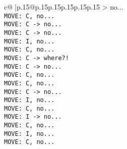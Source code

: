\documentclass{article}
\begin{document}
{\begin{supertabular}{c@{$\;$}|p{.15\linewidth}@{}p{.15\linewidth}p{.15\linewidth}p{.15\linewidth}p{.15\linewidth}p{.15\linewidth}}
{{{> no...\\ \tt  MOVE: C, no...\\ \tt  MOVE: C -> no...\\ \tt  MOVE: C -> no...\\ \tt  MOVE: I, no...\\ \tt  MOVE: C, no...\\ \tt  MOVE: C -> where?!\\ \tt  MOVE: C -> no...\\ \tt  MOVE: C, no...\\ \tt  MOVE: C, no...\\ \tt  MOVE: C -> no...\\ \tt  MOVE: I, no...\\ \tt  MOVE: C, no...\\ \tt  MOVE: I -> no...\\ \tt  MOVE: C, no...\\ \tt  MOVE: I, no...\\ \tt  MOVE: C, no...\\ \tt  }}}
\end{supertabular}}
\end{document}
